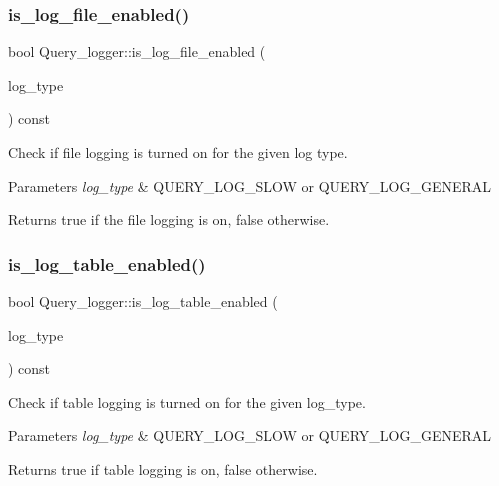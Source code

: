 \subsubsection{\texorpdfstring{is\+\_\+log\+\_\+file\+\_\+enabled()}{is\_log\_file\_enabled()}}
{\footnotesize\ttfamily bool Query\+\_\+logger\+::is\+\_\+log\+\_\+file\+\_\+enabled (\begin{DoxyParamCaption}\item[{enum\+\_\+log\+\_\+table\+\_\+type}]{log\+\_\+type }\end{DoxyParamCaption}) const\hspace{0.3cm}{\ttfamily [inline]}}

Check if file logging is turned on for the given log type.


\begin{DoxyParams}{Parameters}
{\em log\+\_\+type} & Q\+U\+E\+R\+Y\+\_\+\+L\+O\+G\+\_\+\+S\+L\+OW or Q\+U\+E\+R\+Y\+\_\+\+L\+O\+G\+\_\+\+G\+E\+N\+E\+R\+AL\\
\hline
\end{DoxyParams}
\begin{DoxyReturn}{Returns}
true if the file logging is on, false otherwise. 
\end{DoxyReturn}
\mbox{\label{classQuery__logger_aeb50a144282abf8f9e7e5a52c11652bb}} 
\subsubsection{\texorpdfstring{is\+\_\+log\+\_\+table\+\_\+enabled()}{is\_log\_table\_enabled()}}
{\footnotesize\ttfamily bool Query\+\_\+logger\+::is\+\_\+log\+\_\+table\+\_\+enabled (\begin{DoxyParamCaption}\item[{enum\+\_\+log\+\_\+table\+\_\+type}]{log\+\_\+type }\end{DoxyParamCaption}) const\hspace{0.3cm}{\ttfamily [inline]}}

Check if table logging is turned on for the given log\+\_\+type.


\begin{DoxyParams}{Parameters}
{\em log\+\_\+type} & Q\+U\+E\+R\+Y\+\_\+\+L\+O\+G\+\_\+\+S\+L\+OW or Q\+U\+E\+R\+Y\+\_\+\+L\+O\+G\+\_\+\+G\+E\+N\+E\+R\+AL\\
\hline
\end{DoxyParams}
\begin{DoxyReturn}{Returns}
true if table logging is on, false otherwise. 
\end{DoxyReturn}
\mbox{\label{classQuery__logger_a7c11871e7aed4b78ed6201132d68f86e}} 
